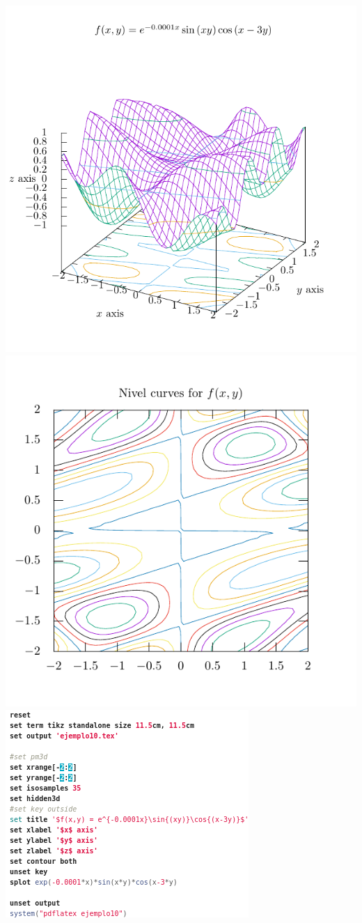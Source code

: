 \documentclass[11.5pt,a4paper]{article}
\begin{document}
\includegraphics[scale=0.8]{ejemplo10.pdf}
\includegraphics[scale=0.8]{ejemplo11.pdf}\\
\includegraphics[scale=0.6]{screen11.png}
\end{document}
